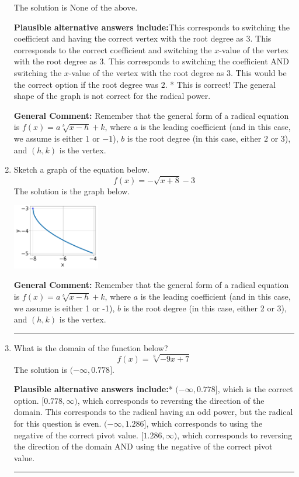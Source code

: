 \documentclass{extbook}[14pt]
\newcommand{\litem}[1]{\item #1

\rule{\textwidth}{0.4pt}}
\begin{document}
\begin{enumerate}
{The solution is \( \text{None of the above} \).\begin{enumerate}[label=\Alph*.]
\textbf{Plausible alternative answers include:}This corresponds to switching the coefficient and having the correct vertex with the root degree as $3$.
This corresponds to the correct coefficient and switching the $x$-value of the vertex with the root degree as $3$.
This corresponds to switching the coefficient AND switching the $x$-value of the vertex with the root degree as $3$.
This would be the correct option if the root degree was $2$.
* This is correct! The general shape of the graph is not correct for the radical power.
\end{enumerate}

\textbf{General Comment:} Remember that the general form of a radical equation is $ f(x) = a \sqrt[b]{x - h} + k$, where $a$ is the leading coefficient (and in this case, we assume is either $1$ or $-1$), $b$ is the root degree (in this case, either $2$ or $3$), and $(h, k)$ is the vertex.
}
\litem{
Sketch a graph of the equation below.
\[ f(x) = - \sqrt{x + 8} - 3 \]The solution is the graph below.
    \begin{center}
        \includegraphics[width=0.3\textwidth]{../Figures/radicalEquationToGraphCopyDA.png}
    \end{center}

\textbf{General Comment:} Remember that the general form of a radical equation is $ f(x) = a \sqrt[b]{x - h} + k $, where $a$ is the leading coefficient (and in this case, we assume is either 1 or -1), $b$ is the root degree (in this case, either 2 or 3), and $(h, k)$ is the vertex.
}
\litem{
What is the domain of the function below?
\[ f(x) = \sqrt[8]{-9 x + 7} \]The solution is \( (-\infty, 0.778] \).\begin{enumerate}[label=\Alph*.]
\textbf{Plausible alternative answers include:}* $(-\infty, 0.778]$, which is the correct option.
 $[0.778, \infty)$, which corresponds to reversing the direction of the domain.
This corresponds to the radical having an odd power, but the radical for this question is even.
$(-\infty, 1.286]$, which corresponds to using the negative of the correct pivot value.
$[1.286, \infty)$, which corresponds to reversing the direction of the domain AND using the negative of the correct pivot value.
\end{enumerate}

}
\end{enumerate}
\end{document}

